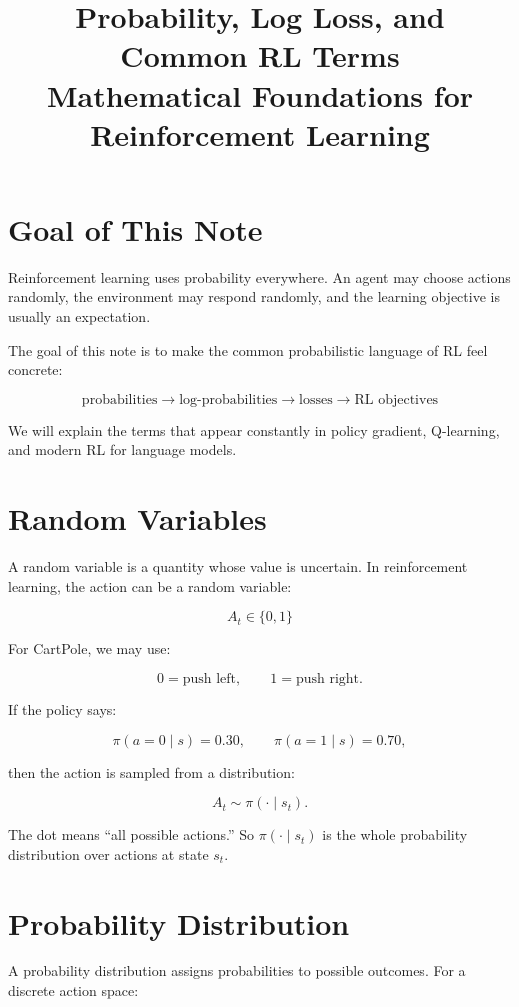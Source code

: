 \documentclass[11pt]{article}
\title{Probability, Log Loss, and Common RL Terms\\
\large Mathematical Foundations for Reinforcement Learning}
\author{}
\date{}
\begin{document}
\maketitle

\section{Goal of This Note}

Reinforcement learning uses probability everywhere.
An agent may choose actions randomly, the environment may respond randomly, and the learning objective is usually an expectation.

The goal of this note is to make the common probabilistic language of RL feel concrete:

\[
\boxed{
\text{probabilities} \rightarrow \text{log-probabilities} \rightarrow \text{losses} \rightarrow \text{RL objectives}
}
\]

We will explain the terms that appear constantly in policy gradient, Q-learning, and modern RL for language models.

\section{Random Variables}

A random variable is a quantity whose value is uncertain.
In reinforcement learning, the action can be a random variable:

\[
A_t \in \{0, 1\}
\]

For CartPole, we may use:

\[
0 = \text{push left},
\qquad
1 = \text{push right}.
\]

If the policy says:

\[
\pi(a=0 \mid s) = 0.30,
\qquad
\pi(a=1 \mid s) = 0.70,
\]

then the action is sampled from a distribution:

\[
A_t \sim \pi(\cdot \mid s_t).
\]

The dot means ``all possible actions.''
So $\pi(\cdot \mid s_t)$ is the whole probability distribution over actions at state $s_t$.

\section{Probability Distribution}

A probability distribution assigns probabilities to possible outcomes.
For a discrete action space:
\end{document}
